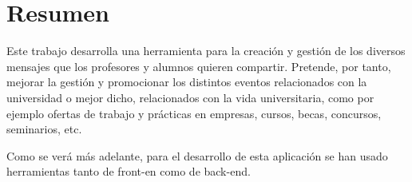 
\chapter*{Resumen}

Este trabajo desarrolla una herramienta para la creación y gestión de los diversos mensajes que los profesores y alumnos quieren compartir. Pretende, por tanto, mejorar la gestión y promocionar los distintos eventos relacionados con la universidad o mejor dicho, relacionados con la vida universitaria, como por ejemplo ofertas de trabajo y prácticas en empresas, cursos, becas, concursos, seminarios, etc.

Como se verá más adelante, para el desarrollo de esta aplicación se han usado herramientas tanto de front-en como de back-end.

